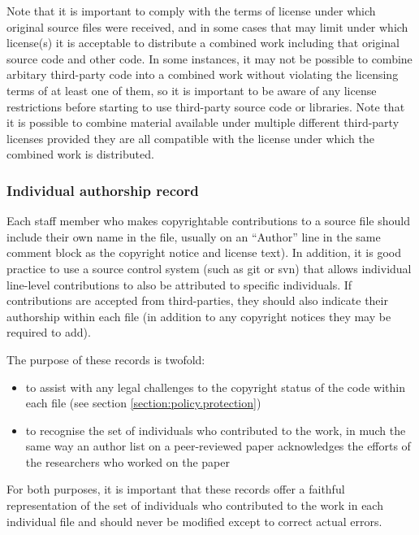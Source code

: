 \documentclass[10pt,a4paper]{article}
\begin{document}
\par Note that it is important to comply with the terms of license under 
which original source files were received, and in some cases that may limit 
under which license(s) it is acceptable to distribute a combined work  
including that original source code and other code. In some instances, it may not  
be possible to combine arbitary third-party code into a combined work without 
violating the licensing terms of at least one of them, so it is important to be aware 
of any license restrictions before starting to use third-party source code or libraries. 
Note that it is possible to combine material available under multiple different 
third-party licenses provided they are all compatible with the license under which 
the combined work is distributed.



\subsubsection{Individual authorship record}
\label{section:impnotes.records}
\par Each staff member who makes copyrightable contributions to a source file 
should include their own name in the file, usually on an ``Author'' line in the 
same comment block as the copyright notice and license text). In addition, it is 
good practice to use a source control system (such as git or svn) that allows 
individual line-level contributions to also be attributed to specific individuals. If 
contributions are accepted from third-parties, they should also indicate their 
authorship within each file (in addition to any copyright notices they may be 
required to add).

\par The purpose of these records is twofold: 
\begin{itemize}
\item to assist with any legal challenges to the copyright status of the code within 
each file (see section \ref{section:policy.protection})
\item to recognise the set of individuals who contributed to the work, in much the 
same way an author list on a peer-reviewed paper acknowledges the efforts of the 
researchers who worked on the paper
\end{itemize}

\par For both purposes, it is important that these records offer a faithful 
representation of the set of individuals who contributed to the work in each 
individual file and should never be modified except to correct actual errors. 
\end{document}
